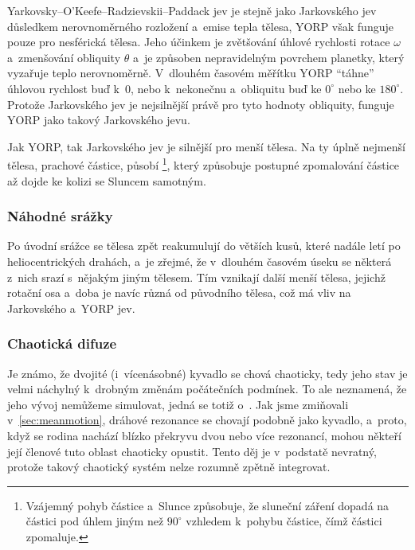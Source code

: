 \documentclass[A4paper, 12pt, oneside, openany]{book}
\begin{document}
Yarkovsky–O'Keefe–Radzievskii–Paddack jev je stejně jako Jarkovského jev důsledkem nerovnoměrného rozložení a~emise tepla tělesa, YORP však funguje pouze pro nesférická tělesa. Jeho účinkem je zvětšování úhlové rychlosti rotace $\omega$ a~zmenšování obliquity $\theta$ a~je způsoben nepravidelným povrchem planetky, který vyzařuje teplo nerovnoměrně. V~dlouhém časovém měřítku YORP \enquote{táhne} úhlovou rychlost buď k~$0$, nebo k~nekonečnu a~obliquitu buď ke $0^\circ$ nebo ke $180^\circ$. Protože Jarkovského jev je nejsilnější právě pro tyto hodnoty obliquity, funguje YORP jako takový  Jarkovského jevu. 

Jak YORP, tak Jarkovského jev je silnější pro menší tělesa. Na ty úplně nejmenší tělesa, prachové částice, působí \footnote{Vzájemný pohyb částice a~Slunce způsobuje, že sluneční záření dopadá na částici pod úhlem jiným než $90^\circ$ vzhledem k~pohybu částice, čímž částici zpomaluje.}, který způsobuje postupné zpomalování částice až dojde ke kolizi se Sluncem samotným. 

\subsubsection{Náhodné srážky}
Po úvodní srážce se tělesa zpět reakumulují do větších kusů, které nadále letí po heliocentrických drahách, a~je zřejmé, že v~dlouhém časovém úseku se některá z~nich srazí s~nějakým jiným tělesem. Tím vznikají další menší tělesa, jejichž rotační osa a~doba je navíc různá od původního tělesa, což má vliv na Jarkovského a~YORP jev. 

\subsubsection{Chaotická difuze}
Je známo, že dvojité (i~vícenásobné) kyvadlo se chová chaoticky, tedy jeho stav je velmi náchylný k~drobným změnám počátečních podmínek. To ale neznamená, že jeho vývoj nemůžeme simulovat, jedná se totiž o~. Jak jsme zmiňovali v~\ref{sec:meanmotion}, dráhové rezonance se chovají podobně jako kyvadlo, a~proto, když se rodina nachází blízko překryvu dvou nebo více rezonancí, mohou někteří její členové tuto oblast chaoticky opustit. Tento děj je v~podstatě nevratný, protože takový chaotický systém nelze rozumně zpětně integrovat.
\end{document}
